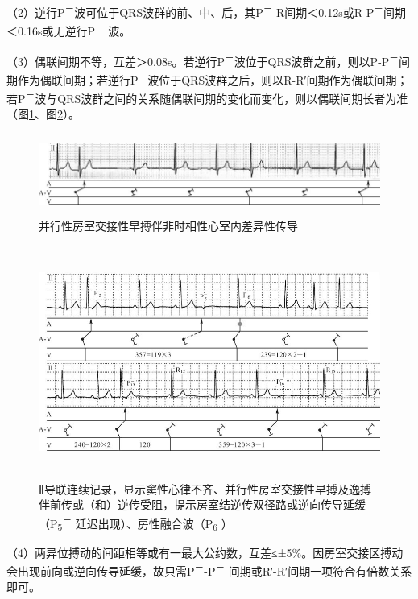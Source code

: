 （2）逆行P\textsuperscript{－}波可位于QRS波群的前、中、后，其P\textsuperscript{－}-R间期＜0.12s或R-P\textsuperscript{－}间期＜0.16s或无逆行P\textsuperscript{－} 波。

（3）偶联间期不等，互差＞0.08s。若逆行P\textsuperscript{－}波位于QRS波群之前，则以P-P\textsuperscript{－}间期作为偶联间期；若逆行P\textsuperscript{－}波位于QRS波群之后，则以R-R′间期作为偶联间期；若P\textsuperscript{－}波与QRS波群之间的关系随偶联间期的变化而变化，则以偶联间期长者为准（图\ref{fig16-7}、图\ref{fig16-8}）。

\begin{figure}[!htbp]
 \centering
 \includegraphics[width=5.77083in,height=1.05208in]{./images/Image00283.jpg}
 \captionsetup{justification=centering}
 \caption{并行性房室交接性早搏伴非时相性心室内差异性传导}
 \label{fig16-7}
  \end{figure} 

\begin{figure}[!htbp]
 \centering
 \includegraphics[width=5.71875in,height=3in]{./images/Image00284.jpg}
 \captionsetup{justification=centering}
 \caption{Ⅱ导联连续记录，显示窦性心律不齐、并行性房室交接性早搏及逸搏伴前传或（和）逆传受阻，提示房室结逆传双径路或逆向传导延缓（P\textsubscript{5}\textsuperscript{－} 延迟出现）、房性融合波（P\textsubscript{6} ）}
 \label{fig16-8}
  \end{figure} 


（4）两异位搏动的间距相等或有一最大公约数，互差≤±5\%。因房室交接区搏动会出现前向或逆向传导延缓，故只需P\textsuperscript{－}-P\textsuperscript{－} 间期或R′-R′间期一项符合有倍数关系即可。

